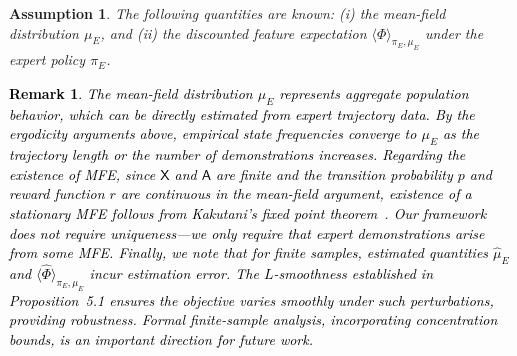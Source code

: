 \documentclass[11pt]{article}
\newcommand{\sX}{{\mathsf X}}
\newcommand{\cH}{{\mathcal H}}
\newcommand{\ns}[1]{\color{black}{#1}\color{magenta}}
\newcommand{\tb}[1]{\textcolor{black}{#1}} %
\newtheorem{assumption}{Assumption}[section]
\newtheorem{remark}{Remark}
\begin{document}
\begin{assumption}
The following quantities are known: (i) the mean-field distribution $\mu_E$, and (ii) the discounted feature expectation $\langle \Phi \rangle_{\pi_E, \mu_E}$ under the expert policy $\pi_E$.
\end{assumption}


\tb{\begin{remark}
The mean-field distribution $\mu_E$ represents aggregate population behavior, which can be directly estimated from expert trajectory data. By the ergodicity arguments above, empirical state frequencies converge to $\mu_E$ as the trajectory length or the number of demonstrations increases. Regarding the existence of MFE, since $\mathsf{X}$ and $\mathsf{A}$ are finite and the transition probability $p$ and reward function $r$ are continuous in the mean-field argument, existence of a stationary MFE follows from Kakutani's fixed point theorem~\cite{AdJoWe15}. Our framework does not require uniqueness---we only require that expert demonstrations arise from some MFE. Finally, we note that for finite samples, estimated quantities $\hat{\mu}_E$ and $\langle \hat{\Phi} \rangle_{\pi_E,\mu_E}$ incur estimation error. The $L$-smoothness established in Proposition~5.1 ensures the objective varies smoothly under such perturbations, providing robustness. Formal finite-sample analysis, incorporating concentration bounds, is an important direction for future work.
\end{remark}}




\end{document}
